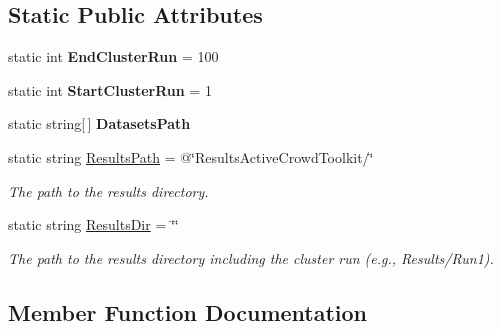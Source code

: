 \subsection*{Static Public Attributes}
\begin{DoxyCompactItemize}
\item 
\hypertarget{class_crowdsourcing_models_1_1_active_crowd_toolkit_experiment_ae5f46a4d791b3033957757238f8b1b68}{}static int {\bfseries End\+Cluster\+Run} = 100\label{class_crowdsourcing_models_1_1_active_crowd_toolkit_experiment_ae5f46a4d791b3033957757238f8b1b68}

\item 
\hypertarget{class_crowdsourcing_models_1_1_active_crowd_toolkit_experiment_a25cccc757eff0be550c8295f6b66627c}{}static int {\bfseries Start\+Cluster\+Run} = 1\label{class_crowdsourcing_models_1_1_active_crowd_toolkit_experiment_a25cccc757eff0be550c8295f6b66627c}

\item 
\hypertarget{class_crowdsourcing_models_1_1_active_crowd_toolkit_experiment_a1558e23c04ed21e11b6375283679a4df}{}static string\mbox{[}$\,$\mbox{]} {\bfseries Datasets\+Path}\label{class_crowdsourcing_models_1_1_active_crowd_toolkit_experiment_a1558e23c04ed21e11b6375283679a4df}

\item 
static string \hyperlink{class_crowdsourcing_models_1_1_active_crowd_toolkit_experiment_ac1654b01a9ba72b7f6b03b72467e628c}{Results\+Path} = @\char`\"{}Results\+Active\+Crowd\+Toolkit/\char`\"{}
\begin{DoxyCompactList}\small\item\em The path to the results directory. \end{DoxyCompactList}\item 
static string \hyperlink{class_crowdsourcing_models_1_1_active_crowd_toolkit_experiment_a244274186037359d3d71723cd7c8dd76}{Results\+Dir} = \char`\"{}\char`\"{}
\begin{DoxyCompactList}\small\item\em The path to the results directory including the cluster run (e.\+g., Results/\+Run1). \end{DoxyCompactList}\end{DoxyCompactItemize}


\subsection{Member Function Documentation}
\hypertarget{class_crowdsourcing_models_1_1_active_crowd_toolkit_experiment_aed18fc802fcb10cb4e36e1d87aa1f47f}{}
